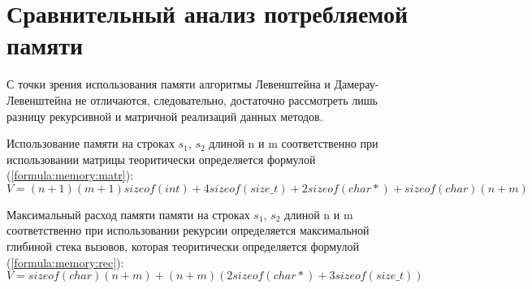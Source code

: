     \section{Сравнительный анализ потребляемой памяти}  
        С точки зрения использования памяти алгоритмы Левенштейна и
        Дамерау-Левенштейна не отличаются, следовательно, достаточно
        рассмотреть лишь разницу рекурсивной и матричной реализаций
        данных методов.
        
        Использование памяти на строках $s_1$, $s_2$ длиной n и m соответственно
        при использовании матрицы теоритически определяется формулой (\ref{formula:memory:matr}):
        \begin{equation}
            V = (n + 1)(m + 1)sizeof(int) + 4sizeof(size\_t) + 2sizeof(char*) + sizeof(char)(n + m)
            \label{formula:memory:matr}
        \end{equation}
        

        Максимальный расход памяти памяти на строках $s_1$, $s_2$ длиной n и m соответственно
        при использовании рекурсии определяется максимальной глибиной стека вызовов,
        которая теоритически определяется формулой (\ref{formula:memory:rec}):
        \begin{equation}
            V = sizeof(char)(n + m)  + (n + m)(2sizeof(char*) + 3sizeof(size\_t))
            \label{formula:memory:rec}
        \end{equation}
\newpage